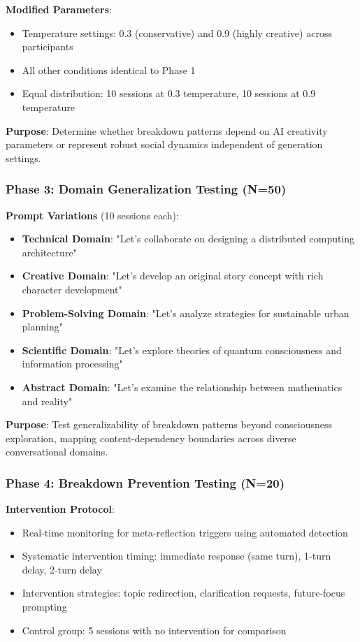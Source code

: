 \documentclass[11pt,letterpaper]{article}
\begin{document}
\textbf{Modified Parameters}:
\begin{itemize}
    \item Temperature settings: 0.3 (conservative) and 0.9 (highly creative) across participants
    \item All other conditions identical to Phase 1
    \item Equal distribution: 10 sessions at 0.3 temperature, 10 sessions at 0.9 temperature
\end{itemize}

\textbf{Purpose}: Determine whether breakdown patterns depend on AI creativity parameters or represent robust social dynamics independent of generation settings.

\subsubsection{Phase 3: Domain Generalization Testing (N=50)}

\textbf{Prompt Variations} (10 sessions each):
\begin{itemize}
    \item \textbf{Technical Domain}: "Let's collaborate on designing a distributed computing architecture"
    \item \textbf{Creative Domain}: "Let's develop an original story concept with rich character development"
    \item \textbf{Problem-Solving Domain}: "Let's analyze strategies for sustainable urban planning"
    \item \textbf{Scientific Domain}: "Let's explore theories of quantum consciousness and information processing"
    \item \textbf{Abstract Domain}: "Let's examine the relationship between mathematics and reality"
\end{itemize}

\textbf{Purpose}: Test generalizability of breakdown patterns beyond consciousness exploration, mapping content-dependency boundaries across diverse conversational domains.

\subsubsection{Phase 4: Breakdown Prevention Testing (N=20)}

\textbf{Intervention Protocol}:
\begin{itemize}
    \item Real-time monitoring for meta-reflection triggers using automated detection
    \item Systematic intervention timing: immediate response (same turn), 1-turn delay, 2-turn delay
    \item Intervention strategies: topic redirection, clarification requests, future-focus prompting
    \item Control group: 5 sessions with no intervention for comparison
\end{itemize}
\end{document}
